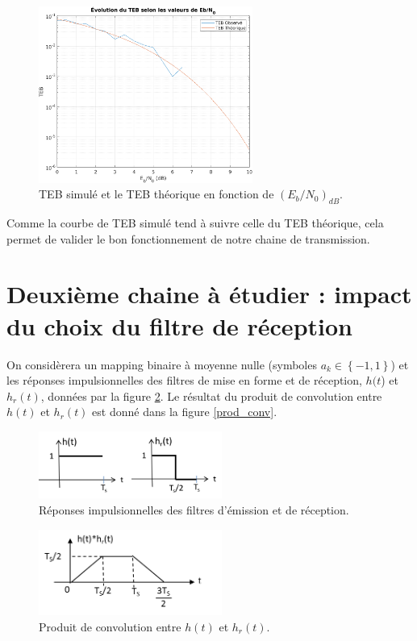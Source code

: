 \documentclass[frenchb]{article}
\begin{document}
\begin{enumerate}
        \begin{figure}[ht!]
		\centering
		\includegraphics[width=7cm]{C1F3.png}		              	    \caption{TEB simulé et le TEB théorique en fonction de $\left(E_b/N_0\right)_{dB}$. \label{fig : C1F3}}
		\end{figure}
		
		Comme la courbe de TEB simulé tend à suivre celle du TEB théorique, cela permet de valider le bon fonctionnement de notre chaine de transmission.
		
		
    \end{enumerate}

\section{Deuxième chaine à étudier : impact du choix du filtre de réception}
On considèrera un mapping binaire à moyenne nulle (symboles $a_k \in \left\{-1,1\right\}$) et les réponses impulsionnelles des filtres de mise en forme et de réception, $h(t$) et $h_r(t)$, données par la figure \ref{rep_imp_ex1_2}. Le résultat du produit de convolution entre $h(t)$ et $h_r(t)$ est donné dans la figure \ref{prod_conv}.

\begin{figure}[ht!]
\centering
\includegraphics[width=6cm]{figure3.png}
\caption{Réponses impulsionnelles des filtres d'émission et de réception.}
 \label{rep_imp_ex1_2}
\end{figure}

\begin{figure}[ht!]
\centering
\includegraphics[width=6cm]{figure6.png}
\caption{Produit de convolution entre $h(t)$ et $h_r(t)$.\label{fig : prod_conv}}
\end{figure}
\end{document}
